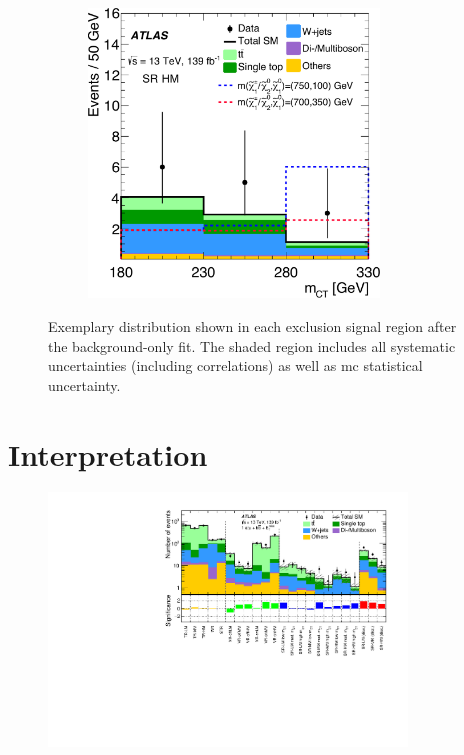 \begin{figure}
\begin{subfigure}[b]{0.5\linewidth}
	\end{subfigure}\hfill
	\begin{subfigure}[b]{0.5\linewidth}
		\centering\includegraphics[width=0.85\textwidth]{OneLepton_Wh_SRHMEM_mct2_yellow}
	\end{subfigure}\hfill

	\caption{Exemplary distribution shown in each exclusion signal region after the background-only fit. The shaded region includes all systematic uncertainties (including correlations) as well as \gls{mc} statistical uncertainty.}
	\label{fig:SR_distributions_postfit}
\end{figure}

\section{Interpretation}

 \begin{figure}
	\centering\includegraphics[width=0.85\textwidth]{histpull_CRVRSR}
	\caption{}
	\label{fig:result_exclusion}
\end{figure}



